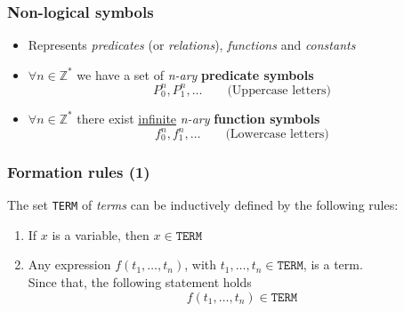 \documentclass{beamer}
\begin{document}
                \begin{frame}
                    \frametitle{Non-logical symbols}
                    \begin{itemize}
                        \item Represents \textit{predicates} (or \textit{relations}), \textit{functions} and \textit{constants}
                        \item $ \forall n \in \mathbb{Z^*} $ we have a set of \textit{n-ary} \textbf{predicate symbols}
                        \[
                            P^n_0, P^n_1, \dots \quad\quad \text{(Uppercase letters)}
                        \] 
                        \item $ \forall n \in \mathbb{Z^*} $ there exist \underline{infinite} \textit{n-ary} \textbf{function symbols}
                        \[
                            f^n_0, f^n_1, \dots \quad\quad \text{(Lowercase letters)}
                        \]
                    \end{itemize}
                \end{frame}

                \begin{frame}
                    \frametitle{Formation rules (1)}
                    \begin{definition}
                        The set \texttt{TERM} of \textit{terms} can be inductively defined by the following rules:
                        \begin{enumerate}
                            \item If $ x $ is a variable, then $ x \in \texttt{TERM}$
                            \item Any expression $ f(t_1, \dots, t_n) $, with $ t_1, \dots, t_n \in \texttt{TERM} $, is a term.\\
                            Since that, the following statement holds
                            \[
                                f(t_1, \dots, t_n) \in \texttt{TERM}
                            \]
                        \end{enumerate}
                    \end{definition}
                \end{frame}
\end{document}
